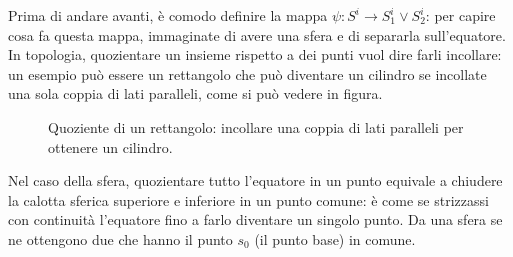 Prima di andare avanti, è comodo definire la mappa $\psi: S^i \to S^i_1 \vee S^i_2$: per capire cosa fa questa mappa, immaginate di avere una sfera e di separarla sull'equatore. In topologia, quozientare un insieme rispetto a dei punti vuol dire farli incollare: un esempio può essere un rettangolo che può diventare un cilindro se incollate una sola coppia di lati paralleli, come si può vedere in figura.

\begin{figure}[H]
    \centering
    \caption{Quoziente di un rettangolo: incollare una coppia di lati paralleli per ottenere un cilindro.}
\end{figure}

Nel caso della sfera, quozientare tutto l'equatore in un punto equivale a chiudere la calotta sferica superiore e inferiore in un punto comune: è come se strizzassi con continuità l'equatore fino a farlo diventare un singolo punto. Da una sfera se ne ottengono due che hanno il punto $s_0$ (il punto base) in comune. 

